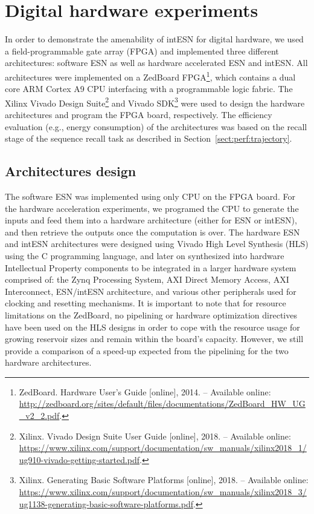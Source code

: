 \section{Digital hardware experiments}
\label{sect:fpga}



In order to demonstrate the amenability of intESN for digital hardware, we used a field-programmable gate array (FPGA) and implemented three different architectures: software ESN as well as hardware accelerated ESN and intESN. 
All architectures were implemented on a ZedBoard FPGA\footnote{ZedBoard. Hardware User's Guide [online], 2014. -- Available online: \url{http://zedboard.org/sites/default/files/documentations/ZedBoard_HW_UG_v2_2.pdf}.}, which contains a dual core ARM Cortex A9 CPU interfacing with a programmable logic fabric. 
The Xilinx Vivado Design Suite\footnote{Xilinx. Vivado Design Suite User Guide [online], 2018. -- Available online: \url{https://www.xilinx.com/support/documentation/sw_manuals/xilinx2018_1/ug910-vivado-getting-started.pdf}.} and Vivado SDK\footnote{Xilinx. Generating Basic Software Platforms [online], 2018. -- Available online: \url{https://www.xilinx.com/support/documentation/sw_manuals/xilinx2018_3/ug1138-generating-basic-software-platforms.pdf}.} were used to design the hardware architectures and program the FPGA board, respectively.
The efficiency evaluation (e.g., energy consumption) of the architectures was based on the recall stage of the sequence recall task  as described in Section~\ref{sect:perf:trajectory}.




\subsection{Architectures design}
\label{sect:fpga:design}


The software ESN was implemented using only CPU on the FPGA board. 
For the hardware acceleration experiments, we programed the CPU to generate the inputs and feed them into a hardware architecture (either for ESN or intESN), and then retrieve the outputs once the computation is over.
The hardware ESN and intESN architectures were designed using Vivado High Level Synthesis (HLS) using the C programming language, and later on synthesized into hardware Intellectual Property components to be integrated in a larger hardware system comprised of: the Zynq Processing System, AXI Direct Memory Access, AXI Interconnect, ESN/intESN architecture, and various other peripherals used for clocking and resetting mechanisms. 
It is important to note that for resource limitations on the ZedBoard, no pipelining or hardware optimization directives have been used on the HLS designs in order to cope with the resource usage for growing reservoir sizes and remain within the board's capacity. However, we still provide a comparison of a speed-up expected from the pipelining for the two hardware architectures.


